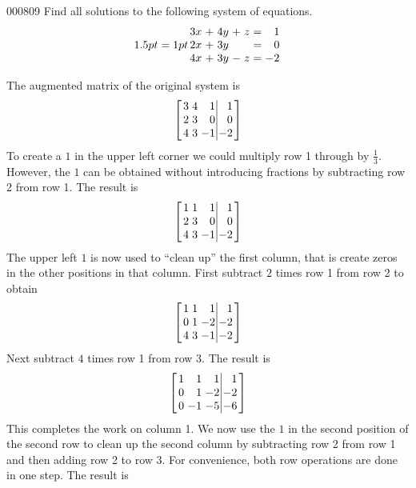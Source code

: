 \begin{example}{}{000809}
Find all solutions to the following system of equations.
\begin{equation*}
\arraycolsep=1pt
\begin{array}{rlrlrcr}
	3x & + & 4y & + & z & = & 1 \\
	2x & + & 3y &   &   & = & 0 \\
	4x & + & 3y & - & z & = & -2
\end{array}
\end{equation*}
\begin{solution}
The augmented matrix of the original system is
\begin{equation*}
\leftB \begin{array}{rrr|r}
	3 & 4 & 1 & 1 \\
	2 & 3 & 0 & 0 \\
	4 & 3 & -1 & -2
\end{array} \rightB
\end{equation*}
To create a $1$ in the upper left corner we could multiply row 1 through by $\frac{1}{3}$. However, the $1$ can be obtained without introducing fractions by subtracting row 2 from row 1. The 
result is
\begin{equation*}
\leftB \begin{array}{rrr|r}
1 & 1 & 1 & 1 \\
2 & 3 & 0 & 0 \\
4 & 3 & -1 & -2
\end{array} \rightB
\end{equation*}
The upper left $1$ is now used to ``clean up'' the first column, that is create zeros in the other positions in that column. First subtract $2$ times row 1 from row 2 to obtain
\begin{equation*}
\leftB \begin{array}{rrr|r}
1 & 1 & 1 & 1 \\
0 & 1 & -2 & -2 \\
4 & 3 & -1 & -2
\end{array} \rightB
\end{equation*}
Next subtract $4$ times row 1 from row 3. The result is
\begin{equation*}
\leftB \begin{array}{rrr|r}
1 & 1 & 1 & 1 \\
0 & 1 & -2 & -2 \\
0 & -1 & -5 & -6
\end{array} \rightB
\end{equation*}
This completes the work on column 1. We now use the $1$ in the second position of the second row to clean up the second column by subtracting row 2 from row 1 and then adding row 2 to row 3. For convenience, both row operations are done in one step. The result is

\end{solution}
\end{example}

